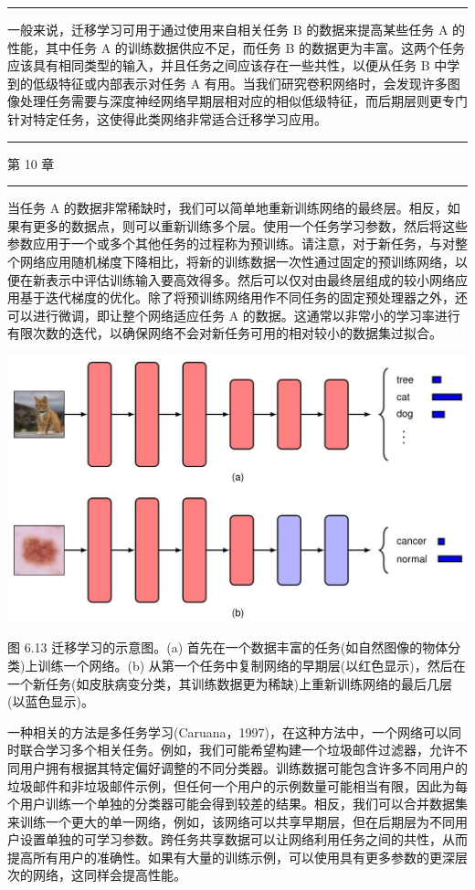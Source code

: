 \documentclass[10pt]{report}
\newcommand{\HRule}{\begin{center}\rule{0.9\linewidth}{0.2mm}\end{center}}
\begin{document}
\HRule

一般来说，迁移学习可用于通过使用来自相关任务 B 的数据来提高某些任务 A 的性能，其中任务 A 的训练数据供应不足，而任务 B 的数据更为丰富。这两个任务应该具有相同类型的输入，并且任务之间应该存在一些共性，以便从任务 B 中学到的低级特征或内部表示对任务 A 有用。当我们研究卷积网络时，会发现许多图像处理任务需要与深度神经网络早期层相对应的相似低级特征，而后期层则更专门针对特定任务，这使得此类网络非常适合迁移学习应用。

\HRule

第 10 章

\HRule

当任务 A 的数据非常稀缺时，我们可以简单地重新训练网络的最终层。相反，如果有更多的数据点，则可以重新训练多个层。使用一个任务学习参数，然后将这些参数应用于一个或多个其他任务的过程称为预训练。请注意，对于新任务，与对整个网络应用随机梯度下降相比，将新的训练数据一次性通过固定的预训练网络，以便在新表示中评估训练输入要高效得多。然后可以仅对由最终层组成的较小网络应用基于迭代梯度的优化。除了将预训练网络用作不同任务的固定预处理器之外，还可以进行微调，即让整个网络适应任务 A 的数据。这通常以非常小的学习率进行有限次数的迭代，以确保网络不会对新任务可用的相对较小的数据集过拟合。

\begin{center}
\includegraphics[max width=1.0\textwidth]{images/0194e279-9b28-703a-88f4-c3ac21e2010d_209_268_340_1262_731_0.jpg}
\end{center}
\hspace*{3em} 

图 6.13 迁移学习的示意图。(a) 首先在一个数据丰富的任务(如自然图像的物体分类)上训练一个网络。(b) 从第一个任务中复制网络的早期层(以红色显示)，然后在一个新任务(如皮肤病变分类，其训练数据更为稀缺)上重新训练网络的最后几层(以蓝色显示)。

一种相关的方法是多任务学习(Caruana，1997)，在这种方法中，一个网络可以同时联合学习多个相关任务。例如，我们可能希望构建一个垃圾邮件过滤器，允许不同用户拥有根据其特定偏好调整的不同分类器。训练数据可能包含许多不同用户的垃圾邮件和非垃圾邮件示例，但任何一个用户的示例数量可能相当有限，因此为每个用户训练一个单独的分类器可能会得到较差的结果。相反，我们可以合并数据集来训练一个更大的单一网络，例如，该网络可以共享早期层，但在后期层为不同用户设置单独的可学习参数。跨任务共享数据可以让网络利用任务之间的共性，从而提高所有用户的准确性。如果有大量的训练示例，可以使用具有更多参数的更深层次的网络，这同样会提高性能。
\end{document}

